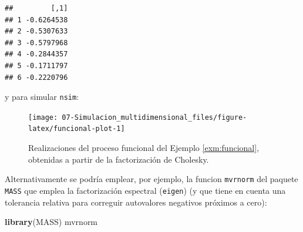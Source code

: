 \documentclass[
]{book}
\newenvironment{Shaded}{\begin{snugshade}}{\end{snugshade}}
\newcommand{\DataTypeTok}[1]{\textcolor[rgb]{0.13,0.29,0.53}{#1}}
\newcommand{\DecValTok}[1]{\textcolor[rgb]{0.00,0.00,0.81}{#1}}
\newcommand{\FloatTok}[1]{\textcolor[rgb]{0.00,0.00,0.81}{#1}}
\newcommand{\KeywordTok}[1]{\textcolor[rgb]{0.13,0.29,0.53}{\textbf{#1}}}
\newcommand{\NormalTok}[1]{#1}
\newcommand{\OperatorTok}[1]{\textcolor[rgb]{0.81,0.36,0.00}{\textbf{#1}}}
\newcommand{\StringTok}[1]{\textcolor[rgb]{0.31,0.60,0.02}{#1}}
\theoremstyle{break}
\theoremstyle{definition}
\theoremstyle{definition}
\theoremstyle{definition}
\theoremstyle{remark}
\begin{document}
\begin{verbatim}
##         [,1]
## 1 -0.6264538
## 2 -0.5307633
## 3 -0.5797968
## 4 -0.2844357
## 5 -0.1711797
## 6 -0.2220796
\end{verbatim}

y para simular \texttt{nsim}:



\begin{Shaded}
\end{Shaded}

\begin{figure}[!htb]

{\centering \texttt{[image: 07-Simulacion\_multidimensional\_files/figure-latex/funcional-plot-1]} 

}

\caption{Realizaciones del proceso funcional del Ejemplo \ref{exm:funcional}, obtenidas a partir de la factorización de Cholesky.}\label{fig:funcional-plot}
\end{figure}

Alternativamente se podría emplear, por ejemplo, la funcion \texttt{mvrnorm}
del paquete \texttt{MASS} que emplea la factorización espectral (\texttt{eigen}) (y que tiene en cuenta una tolerancia relativa para correguir autovalores negativos próximos a cero):



\begin{Shaded}
\begin{Highlighting}[]
\KeywordTok{library}\NormalTok{(MASS)}
\NormalTok{mvrnorm}
\end{Highlighting}
\end{Shaded}
\end{document}
